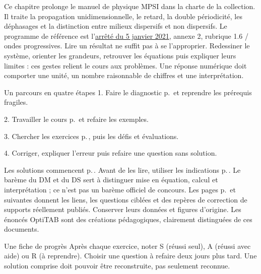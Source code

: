 \thispagestyle{mpsiFront}
Ce chapitre prolonge le manuel de physique MPSI dans la charte de la collection. Il traite la propagation unidimensionnelle, le retard, la double périodicité, les déphasages et la distinction entre milieux dispersifs et non dispersifs. Le programme de référence est l’\href{https://www.education.gouv.fr/bo/21/Special1/ESRS2035779A.htm}{arrêté du 5 janvier 2021}, annexe 2, rubrique 1.6 / ondes progressives.
Lire un résultat ne suffit pas à se l’approprier. Redessiner le système, orienter les grandeurs, retrouver les équations puis expliquer leurs limites : ces gestes relient le cours aux problèmes. Une réponse numérique doit comporter une unité, un nombre raisonnable de chiffres et une interprétation.
\begin{loi}{Un parcours en quatre étapes}
1. Faire le diagnostic p.\,\pageref{diagnostic} et reprendre les prérequis fragiles.\par
2. Travailler le cours p.\,\pageref{cours-1} et refaire les exemples.\par
3. Chercher les exercices p.\,\pageref{td1}, puis les défis et évaluations.\par
4. Corriger, expliquer l’erreur puis refaire une question sans solution.
\end{loi}
Les solutions commencent p.\,\pageref{corr-diag}. Avant de les lire, utiliser les indications p.\,\pageref{indices}. Le barème du DM et du DS sert à distinguer mise en équation, calcul et interprétation ; ce n’est pas un barème officiel de concours.
Les pages p.\,\pageref{sources-1} et suivantes donnent les liens, les questions ciblées et des repères de correction de supports réellement publiés. Conserver leurs données et figures d’origine. Les énoncés OptiTAB sont des créations pédagogiques, clairement distinguées de ces documents.
\begin{methode}{Une fiche de progrès}
Après chaque exercice, noter S (réussi seul), A (réussi avec aide) ou R (à reprendre). Choisir une question à refaire deux jours plus tard. Une solution comprise doit pouvoir être reconstruite, pas seulement reconnue.
\end{methode}


